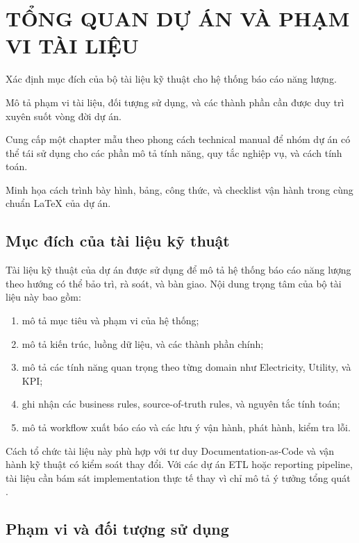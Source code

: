 \chapter{TỔNG QUAN DỰ ÁN VÀ PHẠM VI TÀI LIỆU}

\begin{ChapterObjectives}
\item Xác định mục đích của bộ tài liệu kỹ thuật cho hệ thống báo cáo năng lượng.
\item Mô tả phạm vi tài liệu, đối tượng sử dụng, và các thành phần cần được duy trì xuyên suốt vòng đời dự án.
\item Cung cấp một chapter mẫu theo phong cách technical manual để nhóm dự án có thể tái sử dụng cho các phần mô tả tính năng, quy tắc nghiệp vụ, và cách tính toán.
\item Minh họa cách trình bày hình, bảng, công thức, và checklist vận hành trong cùng chuẩn LaTeX của dự án.
\end{ChapterObjectives}

\section{Mục đích của tài liệu kỹ thuật}

Tài liệu kỹ thuật của dự án được sử dụng để mô tả hệ thống báo cáo năng lượng theo hướng có thể bảo trì, rà soát, và bàn giao. Nội dung trọng tâm của bộ tài liệu này bao gồm:

\begin{enumerate}[label=-]
\item mô tả mục tiêu và phạm vi của hệ thống;
\item mô tả kiến trúc, luồng dữ liệu, và các thành phần chính;
\item mô tả các tính năng quan trọng theo từng domain như Electricity, Utility, và KPI;
\item ghi nhận các business rules, source-of-truth rules, và nguyên tắc tính toán;
\item mô tả workflow xuất báo cáo và các lưu ý vận hành, phát hành, kiểm tra lỗi.
\end{enumerate}

Cách tổ chức tài liệu này phù hợp với tư duy Documentation-as-Code và vận hành kỹ thuật có kiểm soát thay đổi. Với các dự án ETL hoặc reporting pipeline, tài liệu cần bám sát implementation thực tế thay vì chỉ mô tả ý tưởng tổng quát \cite{ref_kimball,ref_python}.

\section{Phạm vi và đối tượng sử dụng}

